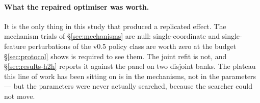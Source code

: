 \paragraph{What the repaired optimiser was worth.} It is the only thing in this
study that produced a replicated effect. The mechanism trials of
\S\ref{sec:mechanisms} are null: single-coordinate and single-feature
perturbations of the v0.5 policy class are worth zero at the budget
\S\ref{sec:protocol} shows is required to see them. The joint refit is not, and
\S\ref{sec:results-h2h} reports it against the panel on two disjoint banks. The
plateau this line of work has been sitting on is in the mechanisms, not in the
parameters --- but the parameters were never actually searched, because the
searcher could not move.

